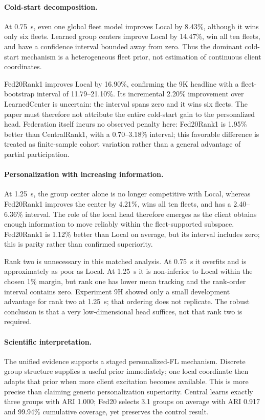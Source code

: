 \paragraph{Cold-start decomposition.}
At 0.75~s, even one global fleet model improves Local by 8.43\%, although it
wins only six fleets. Learned group centers improve Local by 14.47\%, win all
ten fleets, and have a confidence interval bounded away from zero. Thus the
dominant cold-start mechanism is a heterogeneous fleet prior, not estimation of
continuous client coordinates.

Fed20Rank1 improves Local by 16.90\%, confirming the 9K headline with a
fleet-bootstrap interval of 11.79--21.10\%. Its incremental 2.20\% improvement
over LearnedCenter is uncertain: the interval spans zero and it wins six
fleets. The paper must therefore not attribute the entire cold-start gain to the
personalized head. Federation itself incurs no observed penalty here:
Fed20Rank1 is 1.95\% better than CentralRank1, with a 0.70--3.18\% interval;
this favorable difference is treated as finite-sample cohort variation rather
than a general advantage of partial participation.

\paragraph{Personalization with increasing information.}
At 1.25~s, the group center alone is no longer competitive with Local, whereas
Fed20Rank1 improves the center by 4.21\%, wins all ten fleets, and has a
2.40--6.36\% interval. The role of the local head therefore emerges as the
client obtains enough information to move reliably within the fleet-supported
subspace. Fed20Rank1 is 1.12\% better than Local on average, but its interval
includes zero; this is parity rather than confirmed superiority.

Rank two is unnecessary in this matched analysis. At 0.75~s it overfits and is
approximately as poor as Local. At 1.25~s it is non-inferior to Local within the
chosen 1\% margin, but rank one has lower mean tracking and the rank-order
interval contains zero. Experiment 9H showed only a small development advantage
for rank two at 1.25~s; that ordering does not replicate. The robust conclusion
is that a very low-dimensional head suffices, not that rank two is required.

\paragraph{Scientific interpretation.}
The unified evidence supports a staged personalized-FL mechanism. Discrete
group structure supplies a useful prior immediately; one local coordinate then
adapts that prior when more client excitation becomes available. This is more
precise than claiming generic personalization superiority. Central learns
exactly three groups with ARI 1.000; Fed20 selects 3.1 groups on average with
ARI 0.917 and 99.94\% cumulative coverage, yet preserves the control result.

